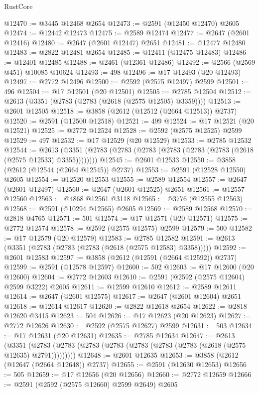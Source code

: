 \begin{lexlean}{RustCore}
\begin{coremodule}
@12470 := @3445 @12468 @2654
@12473 := @2591 (@12450 @12470) @2605
@12474 := @12442 @12473
@12475 := @2589 @12474
@12477 := @2647 (@2601 @12416)
@12480 := @2647 (@2601 @12447) @2651
@12481 := @12477 @12480
@12483 := @2822 @12481 @2654
@12485 := @12411 (@12475 @12483)
@12486 := @12401 @12485
@12488 := @2461 (@12361 @12486)
@12492 := @2566 (@2569 @451) @10085 @10624
@12493 := 498
@12496 := @17 @12493 (@20 @12493)
@12497 := @2772 @12496
@12500 := @2592 (@2575 @12497) @2599
@12501 := 496
@12504 := @17 @12501 (@20 @12501)
@12505 := @2785 @12504
@12512 := @2613 (@3351 (@2783 (@2783 (@2618 (@2575 @12505) @3359))))
@12513 := @2601 @12505
@12518 := @3858 (@2612 (@12512 (@2664 @12513)) @2737)
@12520 := @2591 (@12500 @12518)
@12521 := 499
@12524 := @17 @12521 (@20 @12521)
@12525 := @2772 @12524
@12528 := @2592 (@2575 @12525) @2599
@12529 := 497
@12532 := @17 @12529 (@20 @12529)
@12533 := @2785 @12532
@12544 := @2613 (@3351 (@2783 (@2783 (@2783 (@2783 (@2783 (@2783 (@2618 (@2575 @12533) @3355))))))))
@12545 := @2601 @12533
@12550 := @3858 (@2612 (@12544 (@2664 @12545)) @2737)
@12553 := @2591 (@12528 @12550) @2605
@12554 := @12520 @12553
@12555 := @2589 @12554
@12557 := @2647 (@2601 @12497)
@12560 := @2647 (@2601 @12525) @2651
@12561 := @12557 @12560
@12563 := @4868 @12561 @3118
@12565 := @3776 (@12555 @12563)
@12568 := @2591 (@10294 @12565) @2605
@12569 := @2589 @12568
@12570 := @2818 @4765
@12571 := 501
@12574 := @17 @12571 (@20 @12571)
@12575 := @2772 @12574
@12578 := @2592 (@2575 @12575) @2599
@12579 := 500
@12582 := @17 @12579 (@20 @12579)
@12583 := @2785 @12582
@12591 := @2613 (@3351 (@2783 (@2783 (@2783 (@2618 (@2575 @12583) @3358)))))
@12592 := @2601 @12583
@12597 := @3858 (@2612 (@12591 (@2664 @12592)) @2737)
@12599 := @2591 (@12578 @12597)
@12600 := 502
@12603 := @17 @12600 (@20 @12600)
@12604 := @2772 @12603
@12610 := @2591 (@2592 (@2575 @12604) @2599 @3222) @2605
@12611 := @12599 @12610
@12612 := @2589 @12611
@12614 := @2647 (@2601 @12575)
@12617 := @2647 (@2601 @12604) @2651
@12618 := @12614 @12617
@12620 := @2822 @12618 @2654
@12622 := @2818 @12620 @3415
@12623 := 504
@12626 := @17 @12623 (@20 @12623)
@12627 := @2772 @12626
@12630 := @2592 (@2575 @12627) @2599
@12631 := 503
@12634 := @17 @12631 (@20 @12631)
@12635 := @2785 @12634
@12647 := @2613
    (@3351 (@2783 (@2783 (@2783 (@2783 (@2783 (@2783 (@2783 (@2618 (@2575 @12635) @2791)))))))))
@12648 := @2601 @12635
@12653 := @3858 (@2612 (@12647 (@2664 @12648)) @2737)
@12655 := @2591 (@12630 @12653)
@12656 := 505
@12659 := @17 @12656 (@20 @12656)
@12660 := @2772 @12659
@12666 := @2591 (@2592 (@2575 @12660) @2599 @2649) @2605

\end{coremodule}
\end{lexlean}
